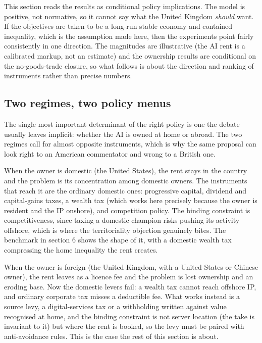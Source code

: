 \documentclass[12pt]{article}
\begin{document}
This section reads the results as conditional policy implications. The
model is positive, not normative, so it cannot say what the United
Kingdom \emph{should} want. If the objectives are taken to be a long-run
stable economy and contained inequality, which is the assumption made
here, then the experiments point fairly consistently in one direction.
The magnitudes are illustrative (the AI rent is a calibrated markup, not
an estimate) and the ownership results are conditional on the
no-goods-trade closure, so what follows is about the direction and
ranking of instruments rather than precise numbers.

\hypertarget{two-regimes-two-policy-menus}{%
\subsection{Two regimes, two policy
menus}\label{two-regimes-two-policy-menus}}

The single most important determinant of the right policy is one the
debate usually leaves implicit: whether the AI is owned at home or
abroad. The two regimes call for almost opposite instruments, which is
why the same proposal can look right to an American commentator and
wrong to a British one.

When the owner is domestic (the United States), the rent stays in the
country and the problem is its concentration among domestic owners. The
instruments that reach it are the ordinary domestic ones: progressive
capital, dividend and capital-gains taxes, a wealth tax (which works
here precisely because the owner is resident and the IP onshore), and
competition policy. The binding constraint is competitiveness, since
taxing a domestic champion risks pushing its activity offshore, which is
where the territoriality objection genuinely bites. The benchmark in
section 6 shows the shape of it, with a domestic wealth tax compressing
the home inequality the rent creates.

When the owner is foreign (the United Kingdom, with a United States or
Chinese owner), the rent leaves as a licence fee and the problem is lost
ownership and an eroding base. Now the domestic levers fail: a wealth
tax cannot reach offshore IP, and ordinary corporate tax misses a
deductible fee. What works instead is a source levy, a digital-services
tax or a withholding written against value recognised at home, and the
binding constraint is not server location (the take is invariant to it)
but where the rent is booked, so the levy must be paired with
anti-avoidance rules. This is the case the rest of this section is
about.
\end{document}
